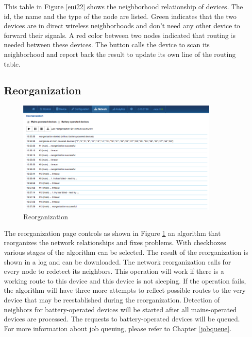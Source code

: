 This table in Figure \ref{eui22} shows the neighborhood relationship of devices. The id,
 the name and the type of the node are listed. Green indicates that the two devices are 
 in direct wireless neighborhoods and don’t need any other device to forward their signals.  
 A red color between two nodes indicated that routing is needed between these devices.  
 The  button calls the device to scan its neighborhood and report back the 
 result to update its own line of the routing table.

\subsection{Reorganization}

\begin{figure}
\begin{center}
\includegraphics[width=0.9\textwidth]{pngs/cap7/eui23.png}
\caption{Reorganization}
\label{eui23}
\end{center}
\end{figure}

The reorganization page controls as shown in Figure \ref{eui23} an algorithm that 
reorganizes the network relationships and fixes problems. With checkboxes various stages 
of the algorithm can be selected. The result of the reorganization is shown in a log and 
can be downloaded. The network reorganization calls for every node to redetect its neighbors. 
This operation will work if there is a working route to this device and this device is 
not sleeping. If the operation fails, the algorithm will have three more attempts to 
reflect possible routes to the very device that may be reestablished during the 
reorganization. Detection of neighbors for battery-operated devices will be started after 
all mains-operated devices are processed. The requests to battery-operated devices will 
be queued. For more information about job queuing, please refer to Chapter \ref{jobqueue}.

